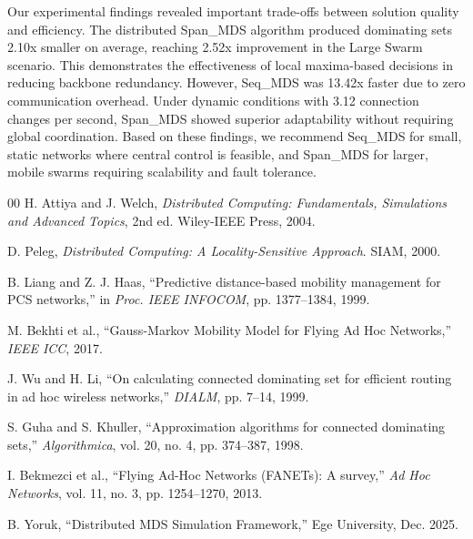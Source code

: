 \documentclass[conference]{IEEEtran}
\begin{document}
Our experimental findings revealed important trade-offs between solution quality and efficiency. The distributed Span\_MDS algorithm produced dominating sets 2.10x smaller on average, reaching 2.52x improvement in the Large Swarm scenario. This demonstrates the effectiveness of local maxima-based decisions in reducing backbone redundancy. However, Seq\_MDS was 13.42x faster due to zero communication overhead. Under dynamic conditions with 3.12 connection changes per second, Span\_MDS showed superior adaptability without requiring global coordination. Based on these findings, we recommend Seq\_MDS for small, static networks where central control is feasible, and Span\_MDS for larger, mobile swarms requiring scalability and fault tolerance.

\begin{thebibliography}{00}
 H. Attiya and J. Welch, \textit{Distributed Computing: Fundamentals, Simulations and Advanced Topics}, 2nd ed. Wiley-IEEE Press, 2004.

 D. Peleg, \textit{Distributed Computing: A Locality-Sensitive Approach}. SIAM, 2000.

 B. Liang and Z. J. Haas, ``Predictive distance-based mobility management for PCS networks,'' in \textit{Proc. IEEE INFOCOM}, pp. 1377--1384, 1999.

 M. Bekhti et al., ``Gauss-Markov Mobility Model for Flying Ad Hoc Networks,'' \textit{IEEE ICC}, 2017.

 J. Wu and H. Li, ``On calculating connected dominating set for efficient routing in ad hoc wireless networks,'' \textit{DIALM}, pp. 7--14, 1999.

 S. Guha and S. Khuller, ``Approximation algorithms for connected dominating sets,'' \textit{Algorithmica}, vol. 20, no. 4, pp. 374--387, 1998.

 I. Bekmezci et al., ``Flying Ad-Hoc Networks (FANETs): A survey,'' \textit{Ad Hoc Networks}, vol. 11, no. 3, pp. 1254--1270, 2013.

 B. Yoruk, ``Distributed MDS Simulation Framework,'' Ege University, Dec. 2025.
\end{thebibliography}
\end{document}
